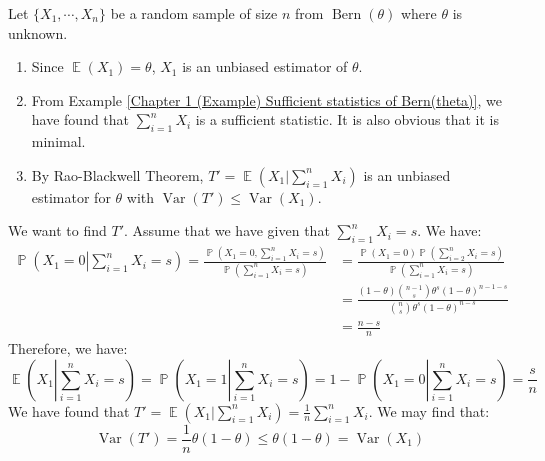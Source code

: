 \documentclass{huhtakm-template-book-v2}
\DeclareMathOperator{\prob}{\mathbb{P}}
\DeclareMathOperator{\E}{\mathbb{E}}
\DeclareMathOperator{\Var}{Var}
\DeclareMathOperator{\Bern}{Bern}
\begin{document}
\begin{eg}
	Let $\{X_{1},\cdots,X_{n}\}$ be a random sample of size $n$ from $\Bern(\theta)$ where $\theta$ is unknown.
	\begin{enumerate}
		\item Since $\E(X_{1})=\theta$, $X_{1}$ is an unbiased estimator of $\theta$.
		\item From Example \ref{Chapter 1 (Example) Sufficient statistics of Bern(theta)}, we have found that $\sum_{i=1}^{n}X_{i}$ is a sufficient statistic. It is also obvious that it is minimal.
		\item By Rao-Blackwell Theorem, $T'=\E(X_{1}|\sum_{i=1}^{n}X_{i})$ is an unbiased estimator for $\theta$ with $\Var(T')\leq\Var(X_{1})$.
	\end{enumerate}
	We want to find $T'$. Assume that we have given that $\sum_{i=1}^{n}X_{i}=s$. We have:
	\begin{align*}
		\prob\left(X_{1}=0\left|\sum_{i=1}^{n}X_{i}=s\right.\right)=\frac{\prob\left(X_{1}=0,\sum_{i=1}^{n}X_{i}=s\right)}{\prob\left(\sum_{i=1}^{n}X_{i}=s\right)}&=\frac{\prob(X_{1}=0)\prob\left(\sum_{i=2}^{n}X_{i}=s\right)}{\prob\left(\sum_{i=1}^{n}X_{i}=s\right)}\\
		&=\frac{(1-\theta)\binom{n-1}{s}\theta^{s}(1-\theta)^{n-1-s}}{\binom{n}{s}\theta^{s}(1-\theta)^{n-s}}\\
		&=\frac{n-s}{n}
	\end{align*}
	Therefore, we have:
	\begin{equation*}
		\E\left(X_{1}\left|\sum_{i=1}^{n}X_{i}=s\right.\right)=\prob\left(X_{1}=1\left|\sum_{i=1}^{n}X_{i}=s\right.\right)=1-\prob\left(X_{1}=0\left|\sum_{i=1}^{n}X_{i}=s\right.\right)=\frac{s}{n}
	\end{equation*}
	We have found that $T'=\E\left(X_{1}|\sum_{i=1}^{n}X_{i}\right)=\frac{1}{n}\sum_{i=1}^{n}X_{i}$. We may find that:
	\begin{equation*}
		\Var(T')=\frac{1}{n}\theta(1-\theta)\leq\theta(1-\theta)=\Var(X_{1})
	\end{equation*}
\end{eg}
\end{document}
